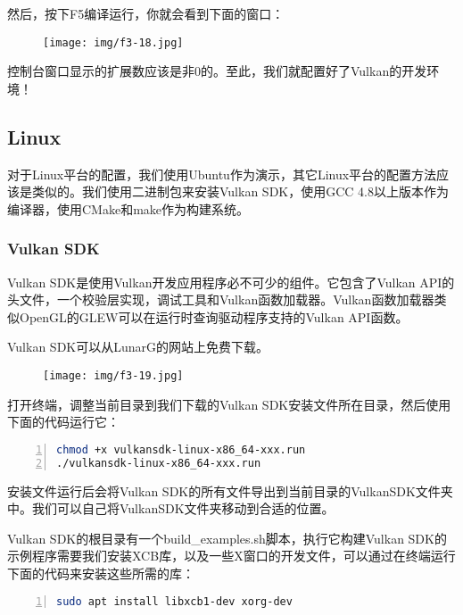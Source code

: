 \documentclass{ctexart}
\begin{document}
然后，按下F5编译运行，你就会看到下面的窗口：

\begin{figure}[H]
	\centering
	\texttt{[image: img/f3-18.jpg]}
\end{figure}

控制台窗口显示的扩展数应该是非0的。至此，我们就配置好了Vulkan的开发环境！

\subsection{Linux}

对于Linux平台的配置，我们使用Ubuntu作为演示，其它Linux平台的配置方法应该是类似的。我们使用二进制包来安装Vulkan SDK，使用GCC 4.8以上版本作为编译器，使用CMake和make作为构建系统。

\subsubsection{Vulkan SDK}

Vulkan SDK是使用Vulkan开发应用程序必不可少的组件。它包含了Vulkan API的头文件，一个校验层实现，调试工具和Vulkan函数加载器。Vulkan函数加载器类似OpenGL的GLEW可以在运行时查询驱动程序支持的Vulkan API函数。

Vulkan SDK可以从LunarG的网站上免费下载。

\begin{figure}[H]
	\centering
	\texttt{[image: img/f3-19.jpg]}
\end{figure}

打开终端，调整当前目录到我们下载的Vulkan SDK安装文件所在目录，然后使用下面的代码运行它：

\begin{lstlisting}[language={bash},keywordstyle=\color{blue!70},commentstyle=\color{red!50!green!50!blue!50},frame=shadowbox, rulesepcolor=\color{red!20!green!20!blue!20},basicstyle=\small,numbers=left, numberstyle=\tiny,breaklines=true]
chmod +x vulkansdk-linux-x86_64-xxx.run
./vulkansdk-linux-x86_64-xxx.run
\end{lstlisting}

安装文件运行后会将Vulkan SDK的所有文件导出到当前目录的VulkanSDK文件夹中。我们可以自己将VulkanSDK文件夹移动到合适的位置。

Vulkan SDK的根目录有一个build\_examples.sh脚本，执行它构建Vulkan SDK的示例程序需要我们安装XCB库，以及一些X窗口的开发文件，可以通过在终端运行下面的代码来安装这些所需的库：

\begin{lstlisting}[language={bash},keywordstyle=\color{blue!70},commentstyle=\color{red!50!green!50!blue!50},frame=shadowbox, rulesepcolor=\color{red!20!green!20!blue!20},basicstyle=\small,numbers=left, numberstyle=\tiny,breaklines=true]
sudo apt install libxcb1-dev xorg-dev
\end{lstlisting}
\end{document}
